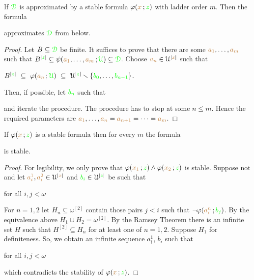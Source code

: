 \documentclass[creche.tex]{subfiles}
\begin{document}
\begin{lemma}
If ${\color{green}\EuScript D}$ is approximated by a stable formula $\varphi({\color{brown} x}\,;{\color{green} z})$ with ladder order $m$.
Then the formula 


approximates ${\color{green}\EuScript D}$ from below.
\end{lemma}

\begin{proof}
Let $B\subseteq{\color{green}\EuScript D}$ be finite.
It suffices to prove that there are some ${\color{brown} a_1},\dots,{\color{brown} a_m}$ such that $B^{|{\color{green} z}|}\subseteq\psi({\color{brown} a_1},\dots,{\color{brown} a_m}\,;{\color{green}\EuScript U})\subseteq{\color{green}\EuScript D}$. Choose ${\color{brown} a_n}\in\EuScript U^{|{\color{brown} x}|}$ such that 

\hfil$B^{|{\color{green} z}|}\ \subseteq\ \varphi({\color{brown} a_n}\,;{\color{green}\EuScript U})\ \subseteq\ \EuScript U^{|{\color{green} z}|}\smallsetminus\{{\color{green} b_0},\dots,{\color{green} b_{n-1}}\}$.

Then, if possible, let ${\color{green} b_n}$ such that


and iterate the procedure.
The procedure has to stop at some $n\le m$.
Hence the required parameters are ${\color{brown} a_1},\dots,{\color{brown} a_n}={\color{brown} a_{n+1}}=\dots={\color{brown} a_{m}}$.
\end{proof}

\begin{lemma}
If $\varphi({\color{brown} x}\,;{\color{green} z})$ is a stable formula then for every $m$ the formula 


is stable.
\end{lemma}

\begin{proof}
For legibility, we only prove that $\varphi({\color{brown} x_1}\,;{\color{green} z})\wedge\varphi({\color{brown} x_2}\,;{\color{green} z})$ is stable.
Suppose not and let ${\color{brown} a^1_i},{\color{brown} a^2_i}\in\EuScript U^{|{\color{brown} x}|}$ and ${\color{green} b_i}\in\EuScript U^{|{\color{green} z}|}$ be such that 

\hfill for all $i,j<\omega$

For $n=1,2$ let $H_n\subseteq\omega^{[2]}$ contain those pairs $j<i$ such that $\neg\varphi({\color{brown} a^n_i}\,;{\color{green} b_j})$. 
By the equivalence above $H_1\cup H_2=\omega^{[2]}$. 
By the Ramsey Theorem there is an infinite set $H$ such that $H^{[2]}\subseteq H_n$ for at least one of $n=1,2$. Suppose $H_1$ for definiteness. So, we obtain an infinite sequence $a^1_i$, $b_i$ such that

\hfill for all $i,j<\omega$

which contradicts the stability of $\varphi({\color{brown} x}\,;{\color{green} z})$.
\end{proof}
\end{document}
